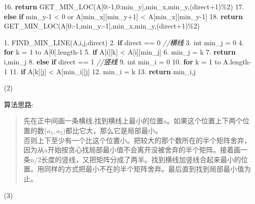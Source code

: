 \documentclass[
]{article}
\newenvironment{Shaded}{}{}
\newcommand{\CommentTok}[1]{\textcolor[rgb]{0.38,0.63,0.69}{\textit{#1}}}
\newcommand{\ControlFlowTok}[1]{\textcolor[rgb]{0.00,0.44,0.13}{\textbf{#1}}}
\newcommand{\DataTypeTok}[1]{\textcolor[rgb]{0.56,0.13,0.00}{#1}}
\newcommand{\DecValTok}[1]{\textcolor[rgb]{0.25,0.63,0.44}{#1}}
\newcommand{\FloatTok}[1]{\textcolor[rgb]{0.25,0.63,0.44}{#1}}
\newcommand{\NormalTok}[1]{#1}
\begin{document}
\begin{Shaded}
\begin{Highlighting}[]
\FloatTok{16.}			\ControlFlowTok{return}\NormalTok{ GET\_MIN\_LOC(A[}\DecValTok{0}\NormalTok{:{-}}\DecValTok{1}\NormalTok{,}\DecValTok{0}\NormalTok{:min\_y],min\_x,min\_y,(direct+}\DecValTok{1}\NormalTok{)\%}\DecValTok{2}\NormalTok{)}
\FloatTok{17.}		\ControlFlowTok{else} \ControlFlowTok{if}\NormalTok{ min\_y{-}}\DecValTok{1}\NormalTok{ \textless{} }\DecValTok{0}\NormalTok{ or A[min\_x][min\_y+}\DecValTok{1}\NormalTok{] \textless{} A[min\_x][min\_y{-}}\DecValTok{1}\NormalTok{]}
\FloatTok{18.}			\ControlFlowTok{return}\NormalTok{ GET\_MIN\_LOC(A[}\DecValTok{0}\NormalTok{:{-}}\DecValTok{1}\NormalTok{,min\_y:{-}}\DecValTok{1}\NormalTok{],min\_x,min\_y,(direct+}\DecValTok{1}\NormalTok{)\%}\DecValTok{2}\NormalTok{)}

\FloatTok{1.}\NormalTok{ FIND\_MIN\_LINE(A,i,j,direct)}
\FloatTok{2.} 	\ControlFlowTok{if}\NormalTok{ direct == }\DecValTok{0} \CommentTok{//横线}
\FloatTok{3.} 		\DataTypeTok{int}\NormalTok{ min\_j = }\DecValTok{0}
\FloatTok{4.} 		\ControlFlowTok{for}\NormalTok{ k = }\DecValTok{1}\NormalTok{ to A[}\DecValTok{0}\NormalTok{].length{-}}\DecValTok{1}
\FloatTok{5.} 			\ControlFlowTok{if}\NormalTok{ A[i][k] \textless{} A[i][min\_j]}
\FloatTok{6.}\NormalTok{ 				min\_j = k}
\FloatTok{7.} 		\ControlFlowTok{return}\NormalTok{ i,min\_j}
\FloatTok{8.} 	\ControlFlowTok{else} \ControlFlowTok{if}\NormalTok{ direct == }\DecValTok{1} \CommentTok{//竖线}
\FloatTok{9.} 		\DataTypeTok{int}\NormalTok{ min\_i = }\DecValTok{0}
\FloatTok{10.}		\ControlFlowTok{for}\NormalTok{ k = }\DecValTok{1}\NormalTok{ to A.length{-}}\DecValTok{1}
\FloatTok{11.}			\ControlFlowTok{if}\NormalTok{ A[k][j] \textless{} A[min\_i][j]}
\FloatTok{12.}\NormalTok{				min\_i = k}
\FloatTok{13.}		\ControlFlowTok{return}\NormalTok{ min\_i,j}
\end{Highlighting}
\end{Shaded}

(2)

算法思路:

\begin{quote}
先在正中间画一条横线,找到横线上最小的位置a。如果这个位置上下两个位置的数(\(a_1,a_2\))都比它大，那么它是局部最小。\\
否则上下至少有一个比这个位置小。把较大的那个数所在的半个矩阵舍弃，因为从a开始按贪心找局部最小值不会离开没被舍弃的半个矩阵。接着画一条n/2长度的竖线，又把矩阵分成了两半。找到横线加竖线合起来最小的位置。用同样的方式把最小不在的半个矩阵舍弃。最后直到找到局部最小值为止。
\end{quote}

(3)
\end{document}
